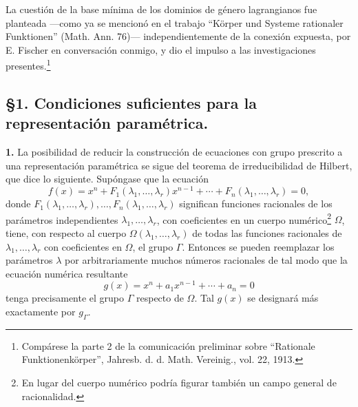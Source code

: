 \documentclass[11pt]{article}
\begin{document}
La cuestión de la base mínima de los dominios de género lagrangianos fue planteada ---como ya se mencionó en el trabajo ``Körper und Systeme rationaler Funktionen'' (Math. Ann. 76)--- independientemente de la conexión expuesta, por E. Fischer en conversación conmigo, y dio el impulso a las investigaciones presentes.\footnote{Compárese la parte 2 de la comunicación preliminar sobre ``Rationale Funktionenkörper'', Jahresb. d. d. Math. Vereinig., vol. 22, 1913.}

\subsection*{\S 1. Condiciones suficientes para la representación paramétrica.}

\textbf{1.} La posibilidad de reducir la construcción de ecuaciones con grupo prescrito a una representación paramétrica se sigue del teorema de irreducibilidad de Hilbert, que dice lo siguiente. Supóngase que la ecuación
\begin{equation}\tag{1}
f(x)=x^n+F_1(\lambda_1,\ldots,\lambda_r)x^{n-1}+\cdots+F_n(\lambda_1,\ldots,\lambda_r)=0,
\end{equation}
donde $F_1(\lambda_1,
\ldots,\lambda_r),\ldots,F_n(\lambda_1,\ldots,\lambda_r)$ significan funciones racionales de los parámetros independientes $\lambda_1,\ldots,\lambda_r$, con coeficientes en un cuerpo numérico\footnote{En lugar del cuerpo numérico podría figurar también un campo general de racionalidad.} $\Omega$, tiene, con respecto al cuerpo $\Omega(\lambda_1,
\ldots,\lambda_r)$ de todas las funciones racionales de $\lambda_1,
\ldots,\lambda_r$ con coeficientes en $\Omega$, el grupo $\Gamma$. Entonces se pueden reemplazar los parámetros $\lambda$ por arbitrariamente muchos números racionales de tal modo que la ecuación numérica resultante
\begin{equation}\tag{2}
g(x)=x^n+a_1x^{n-1}+\cdots+a_n=0
\end{equation}
tenga precisamente el grupo $\Gamma$ respecto de $\Omega$. Tal $g(x)$ se designará más exactamente por $g_\Gamma$.
\end{document}

